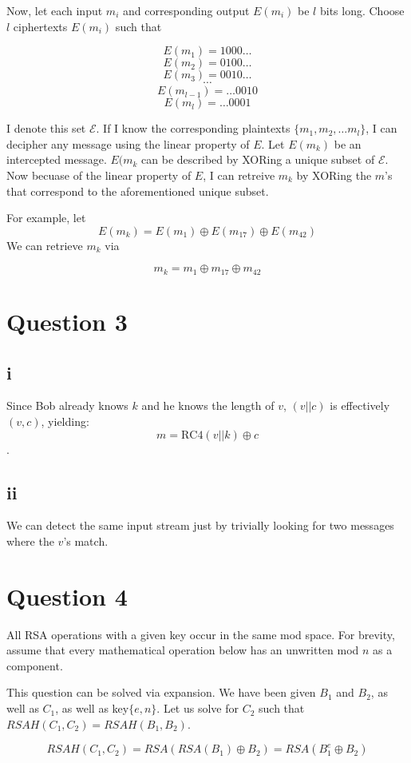 \documentclass[a4paper,10pt]{article}
\begin{document}
Now, let each input $m_{i}$ and corresponding output $E(m_{i})$ be $l$ bits long.  Choose $l$ ciphertexts $E(m_{i})$ such that

$$E(m_{1}) = 1000\dots$$
$$E(m_{2}) = 0100\dots$$
$$E(m_{3}) = 0010\dots$$
$$\cdots{}$$
$$E(m_{l-1}) = \dots0010$$
$$E(m_{l}) = \dots0001$$

I denote this set $\mathscr{E}$. If I know the corresponding plaintexts $\{m_{1}, m_{2}, \dots m_{l}  \}$, I can decipher any message using the linear property of $E$. Let $E(m_{k})$ be an intercepted message. $E(m_{k}$ can be described by XORing a unique subset of  $\mathscr{E}$.  Now becuase of the linear property of $E$, I can retreive $m_{k}$ by XORing the $m$'s that correspond to the aforementioned unique subset.  

For example, let $$E(m_{k}) = E(m_{1}) \oplus E(m_{17}) \oplus E(m_{42}) $$ 
We can retrieve $m_{k}$ via

$$m_{k} = m_{1} \oplus m_{17} \oplus m_{42} $$



\section{Question 3}
\subsection{i} Since Bob already knows $k$ and he knows the length of $v$, $(v||c)$ is effectively $(v,c)$, yielding:
$$m = \text{RC4}(v || k) \oplus c$$.
\subsection{ii}
We can detect the same input stream just by trivially looking for two messages where the $v$'s match.


\section{Question 4}
All RSA operations with a given key occur in the same mod space.  For brevity, assume that every mathematical operation below has an unwritten mod $n$ as a component. 

This question can be solved via expansion.  We have been given $B_{1}$ and $B_{2}$, as well as $C_{1}$, as well as key$\{e,n\}$.  Let us solve for $C_{2}$ such that $RSAH(C_{1},C_{2}) = RSAH(B_{1},B_{2})$.

$$RSAH(C_{1},C_{2}) = RSA(RSA(B_{1}) \oplus B_{2} ) = RSA( B_{1}^{e} \oplus B_{2} ) $$
\end{document}
